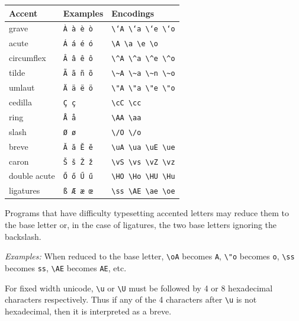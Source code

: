 \documentclass[oneside]{book}
\begin{document}
\begin{longtable}[]{@{}lll@{}}
\toprule
Accent & Examples & Encodings\tabularnewline
\midrule
\endhead
grave & \texttt{À\ à\ è\ ò} &
\texttt{\textbackslash{}`A\ \textbackslash{}`a\ \textbackslash{}`e\ \textbackslash{}`o}\tabularnewline
acute & \texttt{Á\ á\ é\ ó} &
\texttt{\textbackslash{}\textquotesingle{}A\ \textbackslash{}\textquotesingle{}a\ \textbackslash{}\textquotesingle{}e\ \textbackslash{}\textquotesingle{}o}\tabularnewline
circumflex & \texttt{Â\ â\ ê\ ô} &
\texttt{\textbackslash{}\^{}A\ \textbackslash{}\^{}a\ \textbackslash{}\^{}e\ \textbackslash{}\^{}o}\tabularnewline
tilde & \texttt{Ã\ ã\ ñ\ õ} &
\texttt{\textbackslash{}\textasciitilde{}A\ \textbackslash{}\textasciitilde{}a\ \textbackslash{}\textasciitilde{}n\ \textbackslash{}\textasciitilde{}o}\tabularnewline
umlaut & \texttt{Ä\ ä\ ë\ ö} &
\texttt{\textbackslash{}"A\ \textbackslash{}"a\ \textbackslash{}"e\ \textbackslash{}"o}\tabularnewline
cedilla & \texttt{Ç\ ç} &
\texttt{\textbackslash{}cC\ \textbackslash{}cc}\tabularnewline
ring & \texttt{Å\ å} &
\texttt{\textbackslash{}AA\ \textbackslash{}aa}\tabularnewline
slash & \texttt{Ø\ ø} &
\texttt{\textbackslash{}/O\ \textbackslash{}/o}\tabularnewline
breve & \texttt{Ă\ ă\ Ĕ\ ĕ} &
\texttt{\textbackslash{}uA\ \textbackslash{}ua\ \textbackslash{}uE\ \textbackslash{}ue}\tabularnewline
caron & \texttt{Š\ š\ Ž\ ž} &
\texttt{\textbackslash{}vS\ \textbackslash{}vs\ \textbackslash{}vZ\ \textbackslash{}vz}\tabularnewline
double acute & \texttt{Ő\ ő\ Ű\ ű} &
\texttt{\textbackslash{}HO\ \textbackslash{}Ho\ \textbackslash{}HU\ \textbackslash{}Hu}\tabularnewline
ligatures & \texttt{ß\ Æ\ æ\ œ} &
\texttt{\textbackslash{}ss\ \textbackslash{}AE\ \textbackslash{}ae\ \textbackslash{}oe}\tabularnewline
\bottomrule
\end{longtable}

Programs that have difficulty typesetting accented letters may reduce
them to the base letter or, in the case of ligatures, the two base
letters ignoring the backslash.

\emph{Examples:} When reduced to the base letter,
\texttt{\textbackslash{}oA} becomes \texttt{A},
\texttt{\textbackslash{}"o} becomes \texttt{o},
\texttt{\textbackslash{}ss} becomes \texttt{ss},
\texttt{\textbackslash{}AE} becomes \texttt{AE}, etc.

For fixed width unicode, \texttt{\textbackslash{}u} or
\texttt{\textbackslash{}U} must be followed by 4 or 8 hexadecimal
characters respectively. Thus if any of the 4 characters after
\texttt{\textbackslash{}u} is not hexadecimal, then it is interpreted as
a breve.
\end{document}
